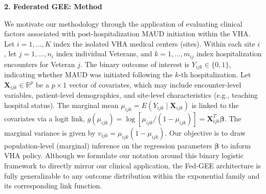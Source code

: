 \documentclass[useAMS,referee, usegraphicx]{biom}
\begin{document}



\vspace{0.5cm}
\textbf{2. Federated GEE: Method}
\label{sec:method}

\noindent We motivate our methodology through the application of evaluating clinical factors associated with post-hospitalization MAUD initiation within the VHA. Let $i = 1, \dots, K$ index the isolated VHA medical centers (sites). Within each site $i$, let $j = 1, \dots, n_i$ index individual Veterans, and $k = 1, \dots, m_{ij}$ index hospitalization encounters for Veteran $j$. The binary outcome of interest is $Y_{ijk} \in \{0, 1\}$, indicating whether MAUD was initiated following the $k$-th hospitalization. Let $\mathbf{X}_{ijk} \in \mathbb{R}^p$ be a $p \times 1$ vector of covariates, which may include encounter-level variables, patient-level demographics, and site-level characteristics (e.g., teaching hospital status). The marginal mean $\mu_{ijk} = E(Y_{ijk} \mid \mathbf{X}_{ijk})$ is linked to the covariates via a logit link, $g(\mu_{ijk}) = \log[\mu_{ijk} / (1 - \mu_{ijk})] = \mathbf{X}_{ijk}^T \boldsymbol{\beta}$. The marginal variance is given by $v_{ijk} = \mu_{ijk}(1 - \mu_{ijk})$.  Our objective is to draw population-level (marginal) inference on the regression parameters $\boldsymbol{\beta}$ to inform VHA policy. Although we formulate our notation around this binary logistic framework to directly mirror our clinical application, the Fed-GEE architecture is fully generalizable to any outcome distribution within the exponential family and its corresponding link function.
\end{document}
